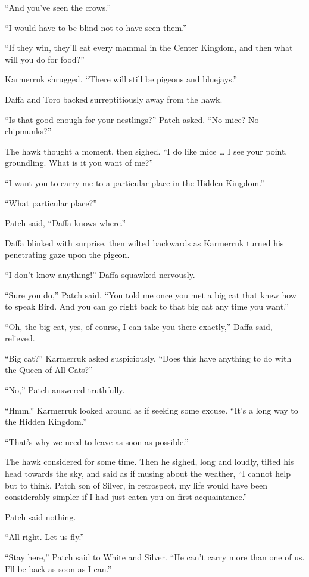 \documentclass[ebook,oneside,openany,12pt]{memoir}
\begin{document}
“And you’ve seen the crows.”

“I would have to be blind not to have seen them.”

“If they win, they’ll eat every mammal in the Center Kingdom, and then
what will you do for food?”

Karmerruk shrugged. “There will still be pigeons and bluejays.”

Daffa and Toro backed surreptitiously away from the hawk.

“Is that good enough for your nestlings?” Patch asked. “No mice? No
chipmunks?”

The hawk thought a moment, then sighed. “I do like mice … I see your
point, groundling. What is it you want of me?”

“I want you to carry me to a particular place in the Hidden Kingdom.”

“What particular place?”

Patch said, “Daffa knows where.”

Daffa blinked with surprise, then wilted backwards as Karmerruk turned
his penetrating gaze upon the pigeon.

“I don’t know anything!” Daffa squawked nervously.

“Sure you do,” Patch said. “You told me once you met a big cat that
knew how to speak Bird. And you can go right back to that big cat any
time you want.”

“Oh, the big cat, yes, of course, I can take you there exactly,” Daffa
said, relieved.

“Big cat?” Karmerruk asked suspiciously. “Does this have anything to
do with the Queen of All Cats?”

“No,” Patch answered truthfully.

“Hmm.” Karmerruk looked around as if seeking some excuse. “It’s a long
way to the Hidden Kingdom.”

“That’s why we need to leave as soon as possible.”

The hawk considered for some time. Then he sighed, long and loudly,
tilted his head towards the sky, and said as if musing about the
weather, “I cannot help but to think, Patch son of Silver, in
retrospect, my life would have been considerably simpler if I had just
eaten you on first acquaintance.”

Patch said nothing.

“All right. Let us fly.”

“Stay here,” Patch said to White and Silver. “He can’t carry more than
one of us. I’ll be back as soon as I can.”
\end{document}
